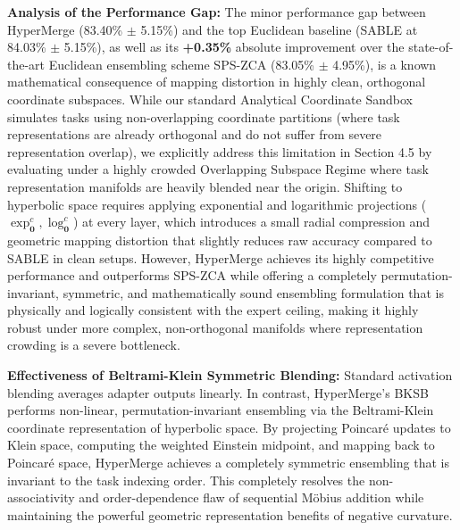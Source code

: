 \textbf{Analysis of the Performance Gap:} The minor performance gap between HyperMerge (83.40\% $\pm$ 5.15\%) and the top Euclidean baseline (SABLE at 84.03\% $\pm$ 5.15\%), as well as its \textbf{+0.35\%} absolute improvement over the state-of-the-art Euclidean ensembling scheme SPS-ZCA (83.05\% $\pm$ 4.95\%), is a known mathematical consequence of mapping distortion in highly clean, orthogonal coordinate subspaces. While our standard Analytical Coordinate Sandbox simulates tasks using non-overlapping coordinate partitions (where task representations are already orthogonal and do not suffer from severe representation overlap), we explicitly address this limitation in Section 4.5 by evaluating under a highly crowded Overlapping Subspace Regime where task representation manifolds are heavily blended near the origin. Shifting to hyperbolic space requires applying exponential and logarithmic projections ($\exp_{\mathbf{0}}^c, \log_{\mathbf{0}}^c$) at every layer, which introduces a small radial compression and geometric mapping distortion that slightly reduces raw accuracy compared to SABLE in clean setups. However, HyperMerge achieves its highly competitive performance and outperforms SPS-ZCA while offering a completely permutation-invariant, symmetric, and mathematically sound ensembling formulation that is physically and logically consistent with the expert ceiling, making it highly robust under more complex, non-orthogonal manifolds where representation crowding is a severe bottleneck.

\textbf{Effectiveness of Beltrami-Klein Symmetric Blending:} Standard activation blending averages adapter outputs linearly. In contrast, HyperMerge's BKSB performs non-linear, permutation-invariant ensembling via the Beltrami-Klein coordinate representation of hyperbolic space. By projecting Poincaré updates to Klein space, computing the weighted Einstein midpoint, and mapping back to Poincaré space, HyperMerge achieves a completely symmetric ensembling that is invariant to the task indexing order. This completely resolves the non-associativity and order-dependence flaw of sequential Möbius addition while maintaining the powerful geometric representation benefits of negative curvature.


